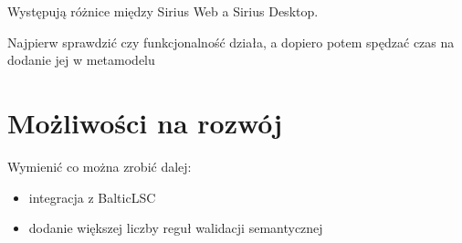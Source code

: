 Występują różnice między Sirius Web a Sirius Desktop.

Najpierw sprawdzić czy funkcjonalność działa, a dopiero potem spędzać czas na
dodanie jej w metamodelu

\section{Możliwości na rozwój}

Wymienić co można zrobić dalej:

\begin{itemize}
	\item integracja z BalticLSC
	\item dodanie większej liczby reguł walidacji semantycznej
\end{itemize}
